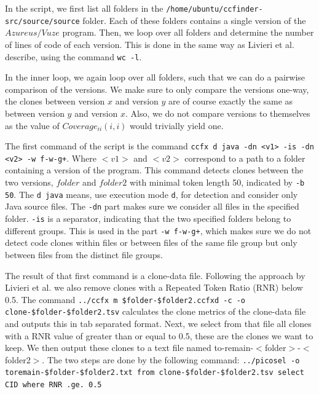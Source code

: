\documentclass[a4paper,twoside, twocolumn, 11pt]{article}
\numberwithin{equation}{section}
\begin{document}
In the script, we first list all folders in the \texttt{/home/ubuntu/ccfinder-src/source/source} folder.
Each of these folders contains a single version of the $Azureus/Vuze$ program.
Then, we loop over all folders and determine the number of lines of code of each version.
This is done in the same way as Livieri et al. describe, using the command \texttt{wc -l}.

In the inner loop, we again loop over all folders, such that we can do a pairwise comparison of the versions.
We make sure to only compare the versions one-way, the clones between version $x$ and version $y$ are of course exactly the same as between version $y$ and version $x$.
Also, we do not compare versions to themselves as the value of $Coverage_{ii}(i,i)$ would trivially yield one.

The first command of the script is the command \texttt{ccfx d java -dn <v1> -is -dn <v2> -w f-w-g+}. 
Where $<v1>$ and $<v2>$ correspond to a path to a folder containing a version of the program.
This command detects clones between the two versions, $folder$ and $folder2$ with minimal token length 50, indicated by \texttt{-b 50}.
The \texttt{d java} means, use execution mode \texttt{d}, for detection and consider only Java source files.
The \texttt{-dn} part makes sure we consider all files in the specified folder.
\texttt{-is} is a separator, indicating that the two specified folders belong to different groups. 
This is used in the part \texttt{-w f-w-g+}, which makes sure we do not detect code clones within files or between files of the same file group but only between files from the distinct file groups.

The result of that first command is a clone-data file. Following the approach by Livieri et al. we also remove clones with a Repeated Token Ratio (RNR) below 0.5. 
The command \texttt{../ccfx m \$folder-\$folder2.ccfxd -c -o clone-\$folder-\$folder2.tsv} calculates the clone metrics of the clone-data file and outputs this in tab separated format. 
Next, we select from that file all clones with a RNR value of greater than or equal to 0.5, these are the clones we want to keep. 
We then output these clones to a text file named to-remain-$<$folder$>$-$<$folder2$>$. 
The two steps are done by the following command: \texttt{../picosel -o toremain-\$folder-\$folder2.txt from clone-\$folder-\$folder2.tsv select CID where RNR .ge. 0.5}
\end{document}
